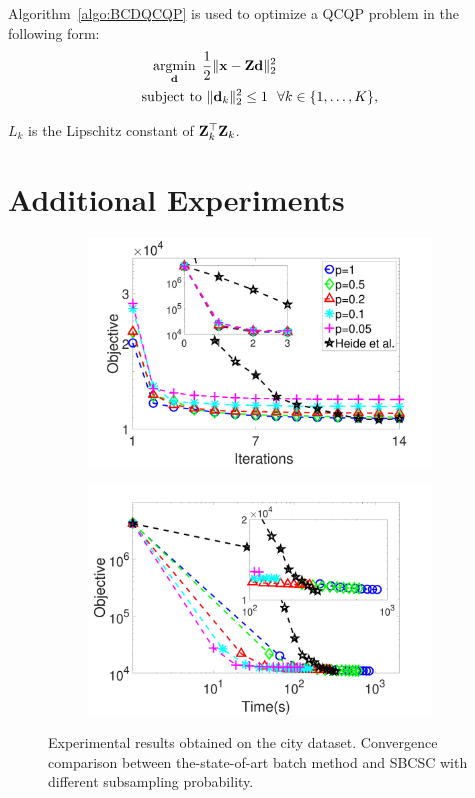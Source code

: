 \documentclass{egpubl}
\begin{document}
Algorithm~\ref{algo:BCDQCQP} is used to optimize a QCQP problem in the following form:
\begin{equation}
\begin{split}
    \minimize{\filter} & \frac{1}{2}\|\signal - \Code \filter \|_2^2 \\
    \text{subject to} & ~ \|\filter_k\|^2_2 \leq 1 ~~ \forall k \in \{1,\dots,K\},
\end{split}
\end{equation}

$L_k$ is the Lipschitz constant of $\Code_k^\top \Code_k$.

\section{Additional Experiments}

\begin{figure}[h]
\begin{subfigure}{0.45\textwidth}
  \includegraphics[width=1\linewidth]{figure/iteVSobj-city.pdf}
\end{subfigure}
\begin{subfigure}{0.45\textwidth}
  \includegraphics[width=1\linewidth]{figure/timeVSobj-city.pdf}
\end{subfigure}

\caption{Experimental results obtained on the city dataset. Convergence comparison between the-state-of-art batch method and SBCSC with different subsampling probability.}
\label{fig:subsampleResult-city}
\end{figure}
\end{document}
